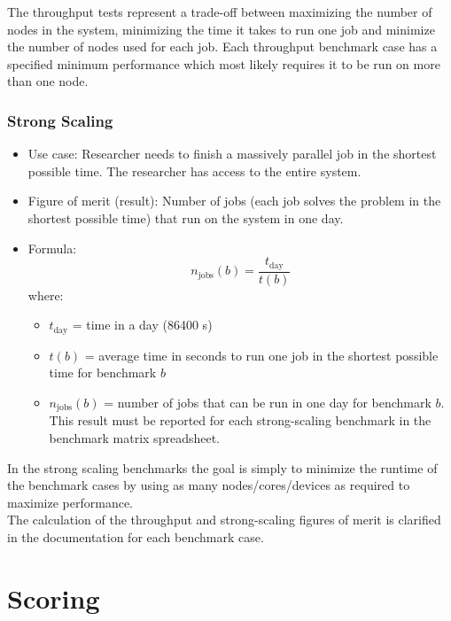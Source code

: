 \documentclass{article}
\begin{document}
The throughput tests represent a trade-off between maximizing the number of nodes in the system, minimizing the time it takes to run one job and minimize the number of nodes used for each job. Each
throughput benchmark case has a specified minimum performance which most likely requires it to be run on more than one node.

\subsubsection*{Strong Scaling}

\begin{itemize}
    \item Use case: Researcher needs to finish a massively parallel job in the shortest possible time. The researcher has access to the entire system.
    \item Figure of merit (result): Number of jobs (each job solves the problem in the shortest possible time) that run on the system in one day.
    \item Formula:
    \begin{equation}
        n_{\textrm{jobs}}(b) = \frac{t_{\textrm{day}}}{t(b)} 
    \end{equation}
    where:
    \begin{itemize}
        \item $t_{\textrm{day}}$ = time in a day (86400 s)
        \item $t(b)$ = average time in seconds to run one job in the shortest possible time for benchmark $b$
        \item $n_{\textrm{jobs}}(b)$ = number of jobs that can be run in one day for benchmark $b$. This result must be reported for each strong-scaling benchmark in the benchmark matrix spreadsheet.
    \end{itemize}
\end{itemize}

In the strong scaling benchmarks the goal is simply to minimize the runtime of the benchmark cases by using as many nodes/cores/devices as required to maximize performance.\\

The calculation of the throughput and strong-scaling figures of merit
is clarified in the documentation for each benchmark case.

\section*{Scoring}
\end{document}
